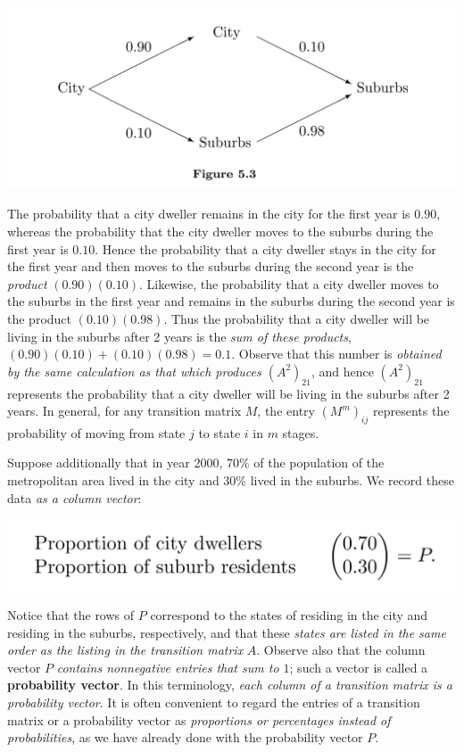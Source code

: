 \includegraphics[width=16cm]{images/figure-5-3.png}

The probability that a city dweller remains in the city for the first year is \(0.90\), whereas the probability that the city dweller moves to the suburbs during the first year is \(0.10\).
Hence the probability that a city dweller stays in the city for the first year and then moves to the suburbs during the
second year is the \emph{product} \((0.90)(0.10)\).
Likewise, the probability that a city dweller moves to the suburbs in the first year and remains in the suburbs during the second year is the product \((0.10)(0.98)\).
Thus the probability that a city dweller will be living in the suburbs after 2 years is the \emph{sum of these products}, \((0.90)(0.10) + (0.10)(0.98) = 0.1\).
Observe that this number is \emph{obtained by the same calculation as that which produces \((A^2)_{21}\)},
and hence \((A^2)_{21}\) represents the probability that a city dweller will be living in the suburbs after 2 years.
In general, for any transition matrix \(M\), the entry \((M^m)_{ij}\) represents the probability of moving from state \(j\) to state \(i\) in \(m\) stages.

Suppose additionally that in year 2000, 70\% of the population of the metropolitan area lived in the city and 30\% lived in the suburbs.
We record these data \emph{as a column vector}:

\includegraphics[width=14cm]{images/5-3-city-suburb-prob-vector-1.png}

Notice that the rows of \(P\) correspond to the states of residing in the city and residing in the suburbs, respectively,
and that these \emph{states are listed in the same order as the listing in the transition matrix} \(A\).
Observe also that the column vector \(P\) \emph{contains nonnegative entries that sum to \(1\)};
such a vector is called a \textbf{probability vector}.
In this terminology, \emph{each column of a transition matrix is a probability vector}.
It is often convenient to regard the entries of a transition matrix or a probability vector as \emph{proportions or percentages instead of probabilities}, as we have already done with the probability vector \(P\).

